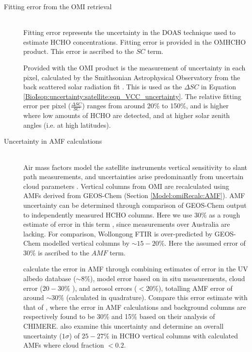     \begin{description}
      \item [Fitting error from the OMI retrieval] \hfill \\
        Fitting error represents the uncertainty in the DOAS technique used to estimate HCHO concentrations.
        Fitting error is provided in the OMHCHO product.
        This error is ascribed to the $SC$ term.
        
        Provided with the OMI product is the measurement of uncertainty in each pixel, calculated by the Smithsonian Astrophysical Observatory from the back scattered solar radiation fit \parencite{Abad2015,Abad2016}.
        This is used as the $\Delta SC$ in Equation \ref{BioIsop:uncertainty:satellite:eqn_VCC_uncertainty}.
        The relative fitting error per pixel ($\frac{\Delta SC}{SC}$) ranges from around 20\% to 150\%, and is higher where low amounts of HCHO are detected, and at higher solar zenith angles (i.e. at high latitudes).
      
      
      \item [Uncertainty in AMF calculations] \hfill \\
        Air mass factors model the satellite instruments vertical sensitivity to slant path measurements, and uncertainties arise predominantly from uncertain cloud parameters \parencite{Palmer2006}.
        Vertical columns from OMI are recalculated using AMFs derived from GEOS-Chem (Section \ref{Model:omiRecalc:AMF}).
        AMF uncertainty can be determined through comparison of GEOS-Chem output to independently measured HCHO columns.
        Here we use 30\% as a rough estimate of error in this term \parencite{Palmer2006}, since measurements over Australia are lacking.
        For comparison, Wollongong FTIR is over-predicted by GEOS-Chem modelled vertical columns by $\sim{15-20}\%$.
        Here the assumed error of 30\% is ascribed to the $AMF$ term.
      
        \textcite{Palmer2006} calculate the error in AMF through combining estimates of error in the UV albedo database ($\sim 8$\%), model error based on in situ measurements, cloud error  ($20-30$\% \parencite{Martin2003}), and aerosol errors ($<20$\%), totalling AMF error of around $\sim 30$\% (calculated in quadrature).
        Compare this error estimate with that of \textcite{Curci2010}, where the error in AMF calculations and background columns are respectively found to be 30\% and 15\% based on their analysis of CHIMERE.
        \textcite{Millet2008} also examine this uncertainty and determine an overall uncertainty ($1\sigma$) of $25-27\%$ in HCHO vertical columns with calculated AMFs where cloud fraction $< 0.2$.
        

\end{description}
